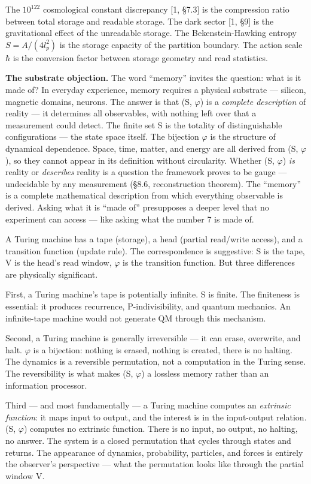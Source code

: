 \documentclass[
  11pt,
]{article}
\begin{document}
The \(10^{122}\) cosmological constant discrepancy {[}1, §7.3{]} is the
compression ratio between total storage and readable storage. The dark
sector {[}1, §9{]} is the gravitational effect of the unreadable
storage. The Bekenstein-Hawking entropy \(S = A/(4l_p^2)\) is the
storage capacity of the partition boundary. The action scale \(\hbar\)
is the conversion factor between storage geometry and read statistics.

\textbf{The substrate objection.} The word ``memory'' invites the
question: what is it made of? In everyday experience, memory requires a
physical substrate --- silicon, magnetic domains, neurons. The answer is
that (S, \(\varphi\)) is a \emph{complete description} of reality --- it
determines all observables, with nothing left over that a measurement
could detect. The finite set S is the totality of distinguishable
configurations --- the state space itself. The bijection \(\varphi\) is
the structure of dynamical dependence. Space, time, matter, and energy
are all derived from (S, \(\varphi\)), so they cannot appear in its
definition without circularity. Whether (S, \(\varphi\)) \emph{is}
reality or \emph{describes} reality is a question the framework proves
to be gauge --- undecidable by any measurement (§8.6, reconstruction
theorem). The ``memory'' is a complete mathematical description from
which everything observable is derived. Asking what it is ``made of''
presupposes a deeper level that no experiment can access --- like asking
what the number 7 is made of.

A Turing machine has a tape (storage), a head (partial read/write
access), and a transition function (update rule). The correspondence is
suggestive: S is the tape, V is the head's read window, \(\varphi\) is
the transition function. But three differences are physically
significant.

First, a Turing machine's tape is potentially infinite. S is finite. The
finiteness is essential: it produces recurrence, P-indivisibility, and
quantum mechanics. An infinite-tape machine would not generate QM
through this mechanism.

Second, a Turing machine is generally irreversible --- it can erase,
overwrite, and halt. \(\varphi\) is a bijection: nothing is erased,
nothing is created, there is no halting. The dynamics is a reversible
permutation, not a computation in the Turing sense. The reversibility is
what makes (S, \(\varphi\)) a lossless memory rather than an information
processor.

Third --- and most fundamentally --- a Turing machine computes an
\emph{extrinsic function}: it maps input to output, and the interest is
in the input-output relation. (S, \(\varphi\)) computes no extrinsic
function. There is no input, no output, no halting, no answer. The
system is a closed permutation that cycles through states and returns.
The appearance of dynamics, probability, particles, and forces is
entirely the observer's perspective --- what the permutation looks like
through the partial window V.
\end{document}
